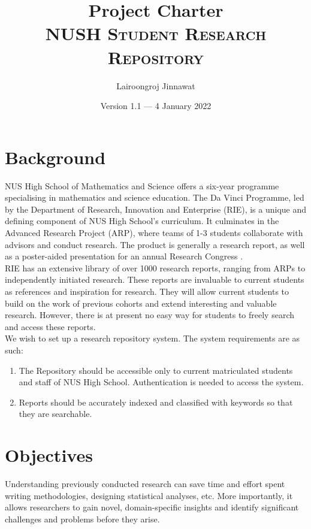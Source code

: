 \documentclass{article}
\title{Project Charter \\ \vspace{2mm} \Large \textsc{NUSH Student Research Repository}}
\author{Lairoongroj Jinnawat}
\date{Version 1.1 --- 4 January 2022}
\begin{document}
\maketitle

\section{Background}

NUS High School of Mathematics and Science offers a six-year programme specialising in mathematics and science education. The Da Vinci Programme, led by the Department of Research, Innovation and Enterprise (RIE), is a unique and defining component of NUS High School’s curriculum. It culminates in the Advanced Research Project (ARP), where teams of 1-3 students collaborate with advisors and conduct research. The product is generally a research report, as well as a poster-aided presentation for an annual Research Congress \parencite{nus_high_school_research_nodate}. \\

RIE has an extensive library of over 1000 research reports, ranging from ARPs to independently initiated research. These reports are invaluable to current students as references and inspiration for research. They will allow current students to build on the work of previous cohorts and extend interesting and valuable research. However, there is at present no easy way for students to freely search and access these reports. \\

We wish to set up a research repository system. The system requirements are as such:

\begin{enumerate}[label=\alph*)]
    \item The Repository should be accessible only to current matriculated students and staff of NUS High School. Authentication is needed to access the system.
    \item Reports should be accurately indexed and classified with keywords so that they are searchable.
\end{enumerate}

\section{Objectives}

Understanding previously conducted research can save time and effort spent writing methodologies, designing statistical analyses, etc. More importantly, it allows researchers to gain novel, domain-specific insights and identify significant challenges and problems before they arise. \\
\end{document}
